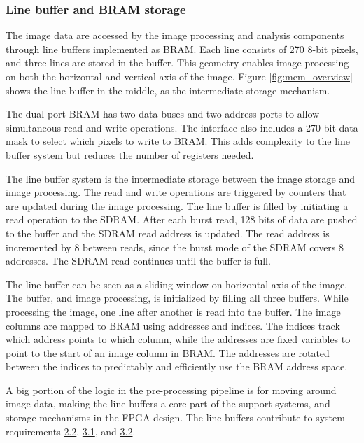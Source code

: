 \documentclass[12pt]{report}
\begin{document}
\subsubsection{Line buffer and BRAM storage}
The image data are accessed by the image processing and analysis components through line buffers implemented as BRAM. Each line consists of 270 8-bit pixels, and three lines are stored in the buffer. This geometry enables image processing on both the horizontal and vertical axis of the image. Figure \ref*{fig:mem_overview} shows the line buffer in the middle, as the intermediate storage mechanism. \citep{stpp}
\par
The dual port BRAM has two data buses and two address ports to allow simultaneous read and write operations. The interface also includes a 270-bit data mask to select which pixels to write to BRAM. This adds complexity to the line buffer system but reduces the number of registers needed. \citep{stpp}
\par
The line buffer system is the intermediate storage between the image storage and image processing. The read and write operations are triggered by counters that are updated during the image processing. The line buffer is filled by initiating a read operation to the SDRAM. After each burst read, 128 bits of data are pushed to the buffer and the SDRAM read address is updated. The read address is incremented by 8 between reads, since the burst mode of the SDRAM covers 8 addresses. The SDRAM read continues until the buffer is full. \citep{stpp}
\par
The line buffer can be seen as a sliding window on horizontal axis of the image. The buffer, and image processing, is initialized by filling all three buffers. While processing the image, one line after another is read into the buffer. The image columns are mapped to BRAM using addresses and indices. The indices track which address points to which column, while the addresses are fixed variables to point to the start of an image column in BRAM. The addresses are rotated between the indices to predictably and efficiently use the BRAM address space. \citep{stpp}
\par
A big portion of the logic in the pre-processing pipeline is for moving around image data, making the line buffers a core part of the support systems, and storage mechanisms in the FPGA design. The line buffers contribute to system requirements \hyperref[req2.2]{2.2}, \hyperref[req3.1]{3.1}, and \hyperref[req3.2]{3.2}.
\end{document}
